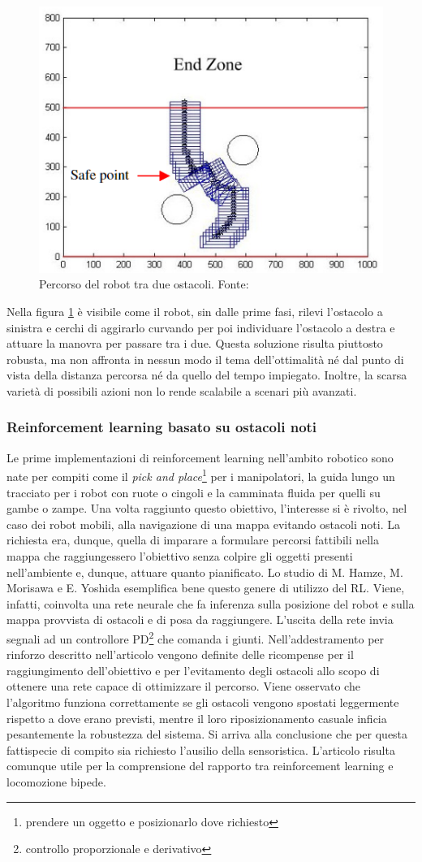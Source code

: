 \begin{figure}[h]
    \centering
    \includegraphics[width=0.35\linewidth]{immagini/simple_OA_IR.png}
    \caption{Percorso del robot tra due ostacoli. Fonte: \cite{wong2007design}}
    \label{fig:simple_ao}
\end{figure}

Nella figura \ref{fig:simple_ao} è visibile come il robot, sin dalle prime fasi, rilevi l'ostacolo a sinistra e cerchi di aggirarlo curvando per poi individuare l'ostacolo a destra e attuare la manovra per passare tra i due. Questa soluzione risulta piuttosto robusta, ma non affronta in nessun modo il tema dell'ottimalità né dal punto di vista della distanza percorsa né da quello del tempo impiegato. Inoltre, la scarsa varietà di possibili azioni non lo rende scalabile a scenari più avanzati.


\subsubsection{Reinforcement learning basato su ostacoli noti}
Le prime implementazioni di reinforcement learning nell'ambito robotico sono nate per compiti come il \textit{pick and place}\footnote{prendere un oggetto e posizionarlo dove richiesto} per i manipolatori, la guida lungo un tracciato per i robot con ruote o cingoli e la camminata fluida per quelli su gambe o zampe. Una volta raggiunto questo obiettivo, l'interesse si è rivolto, nel caso dei robot mobili, alla navigazione di una mappa evitando ostacoli noti. La richiesta era, dunque, quella di imparare a formulare percorsi fattibili nella mappa che raggiungessero l'obiettivo senza colpire gli oggetti presenti nell'ambiente e, dunque, attuare quanto pianificato. Lo studio di M. Hamze, M. Morisawa e E. Yoshida \cite{hamze2024learning} esemplifica bene questo genere di utilizzo del RL. Viene, infatti, coinvolta una rete neurale che fa inferenza sulla posizione del robot e sulla mappa provvista di ostacoli e di posa da raggiungere. L'uscita della rete invia segnali ad un controllore PD\footnote{controllo proporzionale e derivativo} che comanda i giunti. Nell'addestramento per rinforzo descritto nell'articolo vengono definite delle ricompense per il raggiungimento dell'obiettivo e per l'evitamento degli ostacoli allo scopo di ottenere una rete capace di ottimizzare il percorso. Viene osservato che l'algoritmo funziona correttamente se gli ostacoli vengono spostati leggermente rispetto a dove erano previsti, mentre il loro riposizionamento casuale inficia pesantemente la robustezza del sistema. Si arriva alla conclusione che per questa fattispecie di compito sia richiesto l'ausilio della sensoristica. L'articolo risulta comunque utile per la comprensione del rapporto tra reinforcement learning e locomozione bipede.



